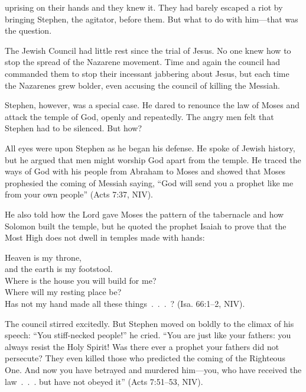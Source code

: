 
 uprising on their hands and they knew it. They had barely escaped a
riot by bringing Stephen, the agitator, before them. But what to do with him—that was the question.

The Jewish Council had little rest since the trial of Jesus. No one knew how to stop the spread of
the Nazarene movement. Time and again the council had commanded them to stop their incessant
jabbering about Jesus, but each time the Nazarenes grew bolder, even accusing the council of killing
the Messiah.

Stephen, however, was a special case. He dared to renounce the law of Moses and attack the temple of
God, openly and repeatedly. The angry men felt that Stephen had to be silenced. But how?

All eyes were upon Stephen as he began his defense. He spoke of Jewish history, but he argued that
men might worship God apart from the temple. He traced the ways of God with his people from Abraham
to Moses and showed that Moses prophesied the coming of Messiah saying, “God will send you a prophet
like me from your own people” (Acts 7:37, NIV).

He also told how the Lord gave Moses the pattern of the tabernacle and how Solomon built the temple,
but he quoted the prophet Isaiah to prove that the Most High does not dwell in temples made with
hands:

\begin{poem}
Heaven is my throne,\\
and the earth is my footstool.\\
Where is the house you will build for me?\\
Where will my resting place be?\\
Has not my hand made all these things~.~.~.~? (Isa. 66:1–2, NIV).
\end{poem}

The council stirred excitedly. But Stephen moved on boldly to the climax of his speech: “You
stiff-necked people!” he cried. “You are just like your fathers: you always resist the Holy Spirit!
Was there ever a prophet your fathers did not persecute? They even killed those who predicted the
coming of the Righteous One. And now you have betrayed and murdered him—you, who have received the
law~.~.~. but have not obeyed it” (Acts 7:51–53, NIV).

